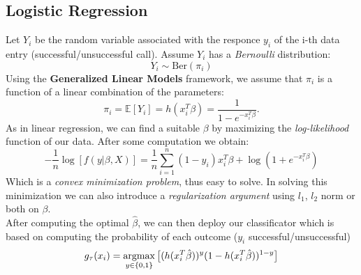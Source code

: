 \subsection{Logistic Regression}
Let \(Y_i\) be the random variable associated with the responce \(y_i\) of the i-th data entry (successful/unsuccessful call). Assume \(Y_i\) has a \textit{Bernoulli} distribution:
\begin{equation}
    Y_i \sim \text{Ber}(\pi_i)
\end{equation}
Using the \textbf{Generalized Linear Models} framework, we assume that \(\pi_i\) is a function of a linear combination of the parameters:
\begin{equation}
    \pi_i = \mathbb{E}[Y_i] = h(x_i^T\beta) = \frac{1}{1- e^{- x_i^T\beta}}.
\end{equation}
As in linear regression, we can find a suitable \(\beta\) by maximizing the \textit{log-likelihood} function of our data. After some computation we obtain:
\begin{equation}
    -\frac{1}{n} \log[f(y|\beta,X)] = \frac{1}{n}  \sum \limits_{i= 1}^{n} (1- y_i) x_i^T \beta + \log(1+ e^{- x_i^T\beta})
\end{equation}
Which is a \textit{convex minimization problem}, thus easy to solve. In solving this minimization we can also introduce a \textit{regularization argument} using \(l_1\), \(l_2\) norm or both on \(\beta\).\\
After computing the optimal \(\hat{\beta}\), we can then deploy our classificator which is based on computing the probability of each outcome (\(y_i\) successful/unsuccessful)
\begin{equation}
    g_\tau(x_i) = \operatorname*{argmax}_{y \in \{0, 1\}} \big[ (h(x_i^T\hat{\beta}))^{y}(1-h(x_i^T\hat{\beta}))^{1- y} \big] 
\end{equation}